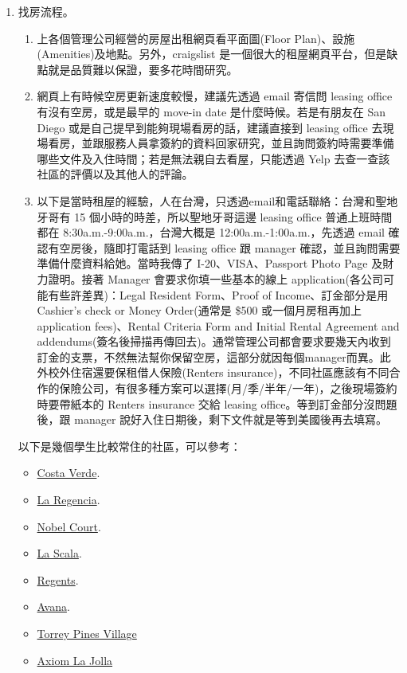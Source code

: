 \documentclass[10pt,a4paper]{book}
\begin{document}
\begin{CJK}{UTF8}{bkai}
\begin{enumerate}
\item 找房流程。
    \begin{enumerate}
    \item 上各個管理公司經營的房屋出租網頁看平面圖(Floor Plan)、設施(Amenities)及地點。另外，craigslist 是一個很大的租屋網頁平台，但是缺點就是品質難以保證，要多花時間研究。
    \item 網頁上有時候空房更新速度較慢，建議先透過 email 寄信問 leasing office 有沒有空房，或是最早的 move-in date 是什麼時候。若是有朋友在 San Diego 或是自己提早到能夠現場看房的話，建議直接到 leasing office 去現場看房，並跟服務人員拿簽約的資料回家研究，並且詢問簽約時需要準備哪些文件及入住時間；若是無法親自去看屋，只能透過 Yelp 去查一查該社區的評價以及其他人的評論。

    \item 以下是當時租屋的經驗，人在台灣，只透過email和電話聯絡：台灣和聖地牙哥有 15 個小時的時差，所以聖地牙哥這邊 leasing office 普通上班時間都在 8:30a.m.-9:00a.m.，台灣大概是 12:00a.m.-1:00a.m.，先透過 email 確認有空房後，隨即打電話到 leasing office 跟 manager 確認，並且詢問需要準備什麼資料給她。當時我傳了 I-20、VISA、Passport Photo Page 及財力證明。接著 Manager 會要求你填一些基本的線上 application(各公司可能有些許差異)：Legal Resident Form、Proof of Income、訂金部分是用 Cashier’s check or Money Order(通常是 \$500 或一個月房租再加上 application fees)、Rental Criteria Form and Initial Rental Agreement and addendums(簽名後掃描再傳回去)。通常管理公司都會要求要幾天內收到訂金的支票，不然無法幫你保留空房，這部分就因每個manager而異。此外校外住宿還要保租借人保險(Renters insurance)，不同社區應該有不同合作的保險公司，有很多種方案可以選擇(月/季/半年/一年)，之後現場簽約時要帶紙本的 Renters insurance 交給 leasing office。等到訂金部分沒問題後，跟 manager 說好入住日期後，剩下文件就是等到美國後再去填寫。
    \end{enumerate}
    
    以下是幾個學生比較常住的社區，可以參考：
        \begin{itemize}
        \item \href{https://www.gardencommunitiesca.com/communities/costa-verde-village/}{Costa Verde}.
        \item \href{https://www.gardencommunitiesca.com/communities/La-Regencia/}{La Regencia}.
        \item \href{http://www.nobelcourt.com/}{Nobel Court}.
        \item \href{http://www.thepremiereresidential.com/properties/san-diego/la-scala/}{La Scala}.
        \item \href{http://www.regentslajolla.net/}{Regents}.
        \item \href{http://www.avanalajolla.com/}{Avana}.
        \item \href{http://www.torreypinesapts.com/}{Torrey Pines Village}
        \item \href{http://www.axiomlajolla.com/}{Axiom La Jolla}
        \end{itemize}


\end{enumerate}
\end{CJK}
\end{document}
